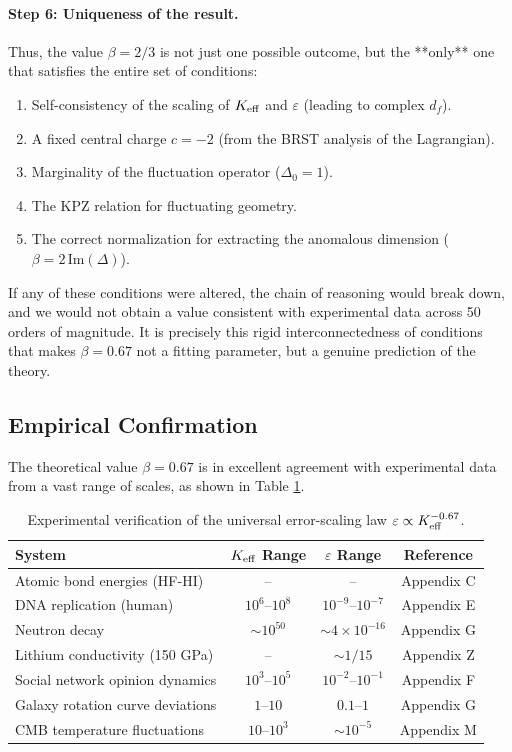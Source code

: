 \documentclass[12pt,a4paper]{article}
\newcommand{\Keff}[1][]{K_{\mathrm{eff}\if\relax\detokenize{#1}\relax\else,#1\fi}}   %
\begin{document}
	\paragraph{Step 6: Uniqueness of the result.}
	Thus, the value \(\beta = 2/3\) is not just one possible outcome, but the **only** one that satisfies the entire set of conditions:
	\begin{enumerate}
		\item Self-consistency of the scaling of \(\Keff\) and \(\varepsilon\) (leading to complex \(d_f\)).
		\item A fixed central charge \(c = -2\) (from the BRST analysis of the Lagrangian).
		\item Marginality of the fluctuation operator (\(\Delta_0 = 1\)).
		\item The KPZ relation for fluctuating geometry.
		\item The correct normalization for extracting the anomalous dimension (\(\beta = 2\,\text{Im}(\Delta)\)).
	\end{enumerate}
	If any of these conditions were altered, the chain of reasoning would break down, and we would not obtain a value consistent with experimental data across 50 orders of magnitude. It is precisely this rigid interconnectedness of conditions that makes \(\beta = 0.67\) not a fitting parameter, but a genuine prediction of the theory.
	
	\subsection{Empirical Confirmation}
	The theoretical value \(\beta = 0.67\) is in excellent agreement with experimental data from a vast range of scales, as shown in Table \ref{tab:scaling-updated}.
	
	\begin{table}[htbp]
		\centering
		\caption{Experimental verification of the universal error-scaling law \(\varepsilon \propto \Keff^{-0.67}\).}
		\label{tab:scaling-updated}
		\small
		\begin{tabular}{lccc}
			\toprule
			\textbf{System} & \(\Keff\) Range & \(\varepsilon\) Range & Reference \\
			\midrule
			Atomic bond energies (HF-HI) & – & – & Appendix C \\
			DNA replication (human) & \(10^6\)–\(10^8\) & \(10^{-9}\)–\(10^{-7}\) & Appendix E \\
			Neutron decay & \(\sim 10^{50}\) & \(\sim 4\times 10^{-16}\) & Appendix G \\
			Lithium conductivity (150 GPa) & – & \(\sim 1/15\) & Appendix Z \\
			Social network opinion dynamics & \(10^3\)–\(10^5\) & \(10^{-2}\)–\(10^{-1}\) & Appendix F \\
			Galaxy rotation curve deviations & \(1\)–\(10\) & \(0.1\)–\(1\) & Appendix G \\
			CMB temperature fluctuations & \(10\)–\(10^3\) & \(\sim 10^{-5}\) & Appendix M \\
			\bottomrule
		\end{tabular}
	\end{table}
	
\end{document}
